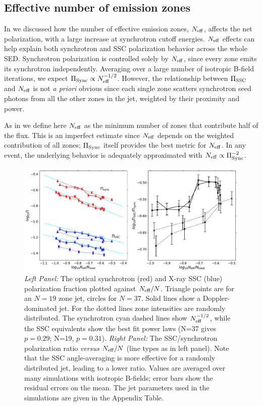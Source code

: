 \subsection{Effective number of emission zones}

In  we discussed how the number of effective emission zones, $N_{\rm eff}$, affects the net polarization, with a large increase at synchrotron cutoff energies. $N_{\rm eff}$ effects can help explain both synchrotron and SSC polarization behavior across the whole SED. Synchrotron polarization is controlled solely by $N_{\rm eff}$, since every zone emits its synchrotron independently. Averaging over a large number of isotropic B-field iterations, we expect $\Pi_{\rm Sync} \propto N_{\rm eff}^{-1/2}$. However, the relationship between $\Pi_{\rm SSC}$ and $N_{\rm eff}$ is not {\it a priori} obvious since each single zone scatters synchrotron seed photons from all the other zones in the jet, weighted by their proximity and power. 

As in  we define here $N_{\rm eff}$ as the minimum number of zones that contribute half of the flux. This is an imperfect estimate since $N_{\rm eff}$ depends on the weighted contribution of all zones; $\Pi_{\rm Sync}$ itself provides the best metric for $N_{\rm eff}$. In any event, the underlying behavior is adequately approximated with $N_{\rm eff} \propto \Pi_{\rm Sync}^{-2}$.

\begin{figure}[t]
 \includegraphics[width=1\linewidth]{figures/Figure10.pdf}
 \centering
 \caption{\textit{Left Panel:} The optical synchrotron (red) and X-ray SSC (blue) polarization fraction plotted against $N_{\rm eff}/N$. Triangle points are for an $N=19$ zone jet, circles for $N=37$. Solid lines show a Doppler-dominated jet. For the dotted lines zone intensities are randomly distributed. The synchrotron cyan dashed lines show $N_{\rm eff}^{-1/2}$, while the SSC equivalents show the best fit power laws (N=37 gives $p=0.29$; N=19, $p=0.31$). 
 \textit{Right Panel:} 
 The SSC/synchrotron polarization ratio {\it versus} $N_{\rm eff}/N$ (line types as in left panel). Note that the SSC angle-averaging is more effective for a randomly distributed jet, leading to a lower ratio. Values are averaged over many simulations with isotropic B-fields; error bars show the residual errors on the mean. The jet parameters used in the simulations are given in the Appendix Table.}
 \label{fig:ssc10}
\end{figure}

